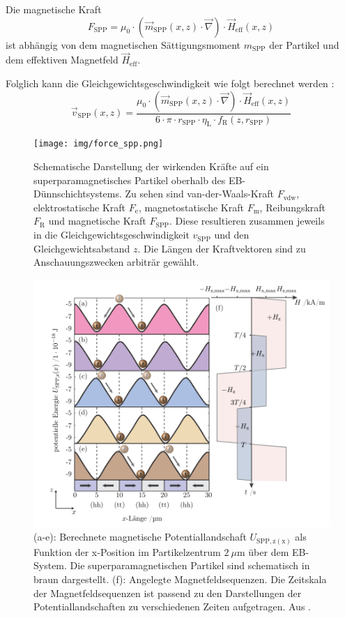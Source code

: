\documentclass[page,pdftex,12pt,a4paper,twoside,openright]{scrbook}
\begin{document}
Die magnetische Kraft
\begin{equation}
F_\mathrm{SPP} = \mu_0 \cdot (\vec{m}_\mathrm{SPP}(x,z) \cdot \vec{\nabla}) \cdot \vec{H}_\mathrm{eff}(x,z)
\end{equation}
ist abhängig von dem magnetischen Sättigungsmoment \(m_\mathrm{SPP}\) der Partikel und dem effektiven Magnetfeld \(\vec{H}_\mathrm{eff}\).

Folglich kann die Gleichgewichtsgeschwindigkeit wie folgt berechnet werden \cite{holzinger_transport_2015}: 
\begin{equation}
\vec{v}_\mathrm{SPP} (x,z) =
\frac{ \mu_0 \cdot (\vec{m}_\mathrm{SPP}(x,z) \cdot \vec{\nabla}) \cdot \vec{H}_\mathrm{eff}(x,z)}
{6 \cdot \pi \cdot r_\mathrm{SPP} \cdot \eta_\mathrm{L} \cdot f_\mathrm{R}(z,r_\mathrm{SPP})}
\end{equation}

\begin{figure}[h]
\centering
\texttt{[image: img/force\_spp.png]}
\caption{\label{fig-force_spp}
Schematische Darstellung der wirkenden Kräfte auf ein superparamagnetisches Partikel oberhalb des EB-Dünnschichtsystems. Zu sehen sind van-der-Waals-Kraft \(F_\mathrm{vdw}\), elektrostatische Kraft \(F_\mathrm{e}\), magnetostatische Kraft \(F_\mathrm{m}\), Reibungskraft \(F_\mathrm{R}\) und magnetische Kraft \(F_\mathrm{SPP}\). Diese resultieren zusammen jeweils in die Gleichgewichtsgeschwindigkeit \(v_\mathrm{SPP}\) und den Gleichgewichtsabstand \(z\). Die Längen der Kraftvektoren sind zu Anschauungszwecken arbiträr gewählt.}
\end{figure}


\begin{figure}[h]
\centering
\includegraphics[width=.75\textwidth]{img/trapez.png}
\caption{\label{fig-transport}
(a-e): Berechnete magnetische Potentiallandschaft \(U_\mathrm{SPP,z(x)}\) als Funktion der x-Position im Partikelzentrum \(\SI{2}{\mu\meter}\) über dem EB-System. Die superparamagnetischen Partikel sind schematisch in braun dargestellt. (f): Angelegte Magnetfeldsequenzen. Die Zeitskala der Magnetfeldsequenzen ist passend zu den Darstellungen der Potentiallandschaften zu verschiedenen Zeiten aufgetragen. Aus \cite{holzinger_transport_2015}.}
\end{figure}
\end{document}

